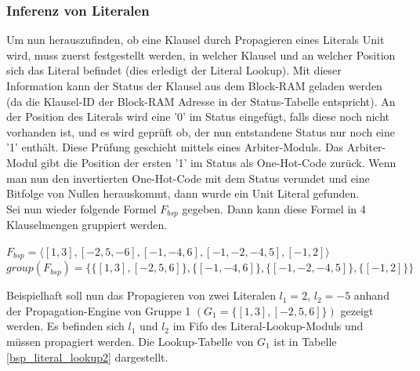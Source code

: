 \subsubsection{Inferenz von Literalen}
Um nun herauszufinden, ob eine Klausel durch Propagieren 
eines Literals Unit wird, muss zuerst festgestellt werden, 
in welcher Klausel und an welcher Position sich das Literal
befindet (dies erledigt der Literal Lookup). 
Mit dieser Information kann der Status der Klausel aus dem 
Block-RAM geladen werden (da die Klausel-ID der Block-RAM Adresse
in der Status-Tabelle entspricht). An der Position des
Literals wird eine '0' im Status eingefügt, falls diese
noch nicht vorhanden ist, und es wird geprüft ob, der nun
entstandene Status nur noch eine '1' enthält. Diese Prüfung geschieht mittels
eines Arbiter-Moduls. Das Arbiter-Modul gibt die Position der ersten '1'
im Status als One-Hot-Code zurück. Wenn man nun den invertierten One-Hot-Code
mit dem Status verundet und eine Bitfolge von Nullen herauskommt,
dann wurde ein Unit Literal gefunden.\\
Sei nun wieder folgende Formel $F_{bsp}$ gegeben.
Dann kann diese Formel in 4 Klauselmengen gruppiert werden.
\begin{center}
$F_{bsp} = \langle [1,3],[-2, 5, -6], [-1,-4,6], [-1,-2,-4,5], [-1,2]\rangle$\\
$group(F_{bsp}) = \{\{[1,3],[-2,5,6]\},\{[-1,-4,6]\},\{[-1,-2,-4,5]\},\{[-1,2]\}\}$
\end{center}
Beispielhaft soll nun das Propagieren von zwei Literalen $l_1 = 2$, $l_2 = -5$ 
anhand der Propagation-Engine von Gruppe 1 
$(G_1 = \{[1,3],[-2,5,6]\})$ gezeigt werden. Es befinden sich $l_1$ und $l_2$ 
im Fifo des Literal-Lookup-Moduls und müssen propagiert werden.
Die Lookup-Tabelle von $G_1$ ist in Tabelle \ref{bsp_literal_lookup2} dargestellt.

